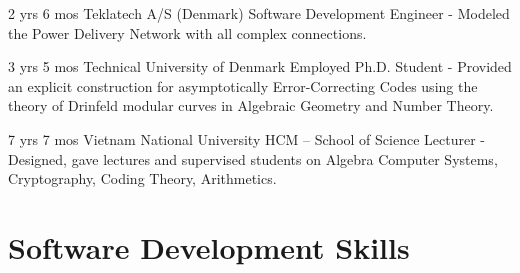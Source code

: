 \documentclass[11pt]{article} %
\begin{document}
\begin{paracol}{2}

{2 yrs 6 mos} %
{Teklatech A/S (Denmark)} %
{Software Development Engineer} %
{- Modeled the Power Delivery Network with all complex connections.}  %


{3 yrs 5 mos} %
{Technical University of Denmark} %
{Employed Ph.D. Student} %
{- Provided an explicit construction for asymptotically Error-Correcting Codes using the theory of Drinfeld modular curves in Algebraic Geometry and Number Theory.} %




\switchcolumn %

{7 yrs 7 mos} %
{Vietnam National University HCM -- School of Science} %
{Lecturer} %
{- Designed, gave lectures and supervised students on Algebra Computer Systems, Cryptography, Coding Theory, Arithmetics.} %






\section{Software Development Skills} 





\end{paracol}
\end{document}
